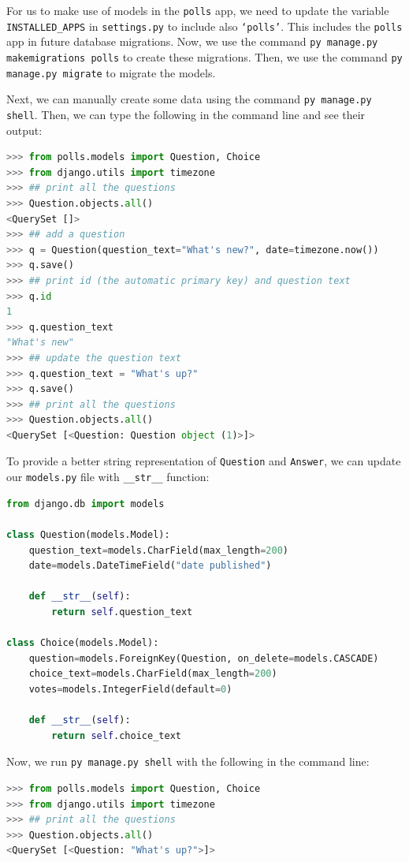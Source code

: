 \documentclass[a4paper, openany]{memoir}
\begin{document}
    \noindent For us to make use of models in the \texttt{polls} app, we need to update the variable \texttt{INSTALLED\_APPS} in \texttt{settings.py} to include also \texttt{`polls'}. This includes the \texttt{polls} app in future database migrations. Now, we use the command \texttt{py manage.py makemigrations polls} to create these migrations. Then, we use the command \texttt{py manage.py migrate} to migrate the models.

    \noindent Next, we can manually create some data using the command \texttt{py manage.py shell}. Then, we can type the following in the command line and see their output:
\begin{lstlisting}[language=python]
>>> from polls.models import Question, Choice
>>> from django.utils import timezone
>>> ## print all the questions
>>> Question.objects.all()
<QuerySet []>
>>> ## add a question
>>> q = Question(question_text="What's new?", date=timezone.now())
>>> q.save()
>>> ## print id (the automatic primary key) and question text
>>> q.id
1
>>> q.question_text
"What's new"
>>> ## update the question text
>>> q.question_text = "What's up?"
>>> q.save()
>>> ## print all the questions
>>> Question.objects.all()
<QuerySet [<Question: Question object (1)>]>
\end{lstlisting}
    To provide a better string representation of \texttt{Question} and \texttt{Answer}, we can update our \texttt{models.py} file with \texttt{\_\_str\_\_} function:
\begin{lstlisting}[language=python]
from django.db import models

class Question(models.Model):
    question_text=models.CharField(max_length=200)
    date=models.DateTimeField("date published")
    
    def __str__(self):
        return self.question_text

class Choice(models.Model):
    question=models.ForeignKey(Question, on_delete=models.CASCADE)
    choice_text=models.CharField(max_length=200)
    votes=models.IntegerField(default=0)
    
    def __str__(self):
        return self.choice_text
\end{lstlisting}
    Now, we run \texttt{py manage.py shell} with the following in the command line:
\begin{lstlisting}[language=python]
>>> from polls.models import Question, Choice
>>> from django.utils import timezone
>>> ## print all the questions
>>> Question.objects.all()
<QuerySet [<Question: "What's up?">]>
\end{lstlisting}
\end{document}
